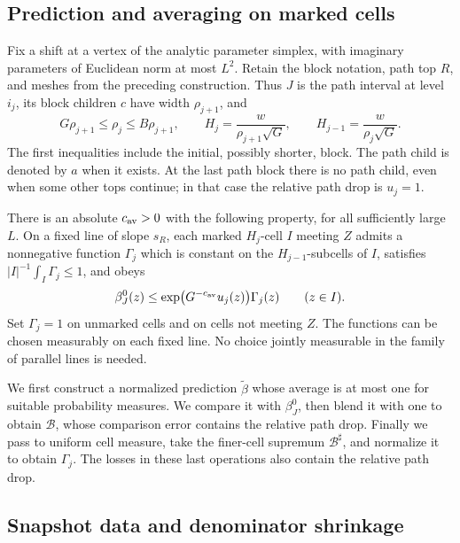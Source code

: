 \subsection{Prediction and averaging on marked cells}
\label{pred:section}

Fix a shift at a vertex of the analytic parameter simplex, with imaginary
parameters of Euclidean norm at most \(L^2\). Retain the block notation,
path top \(R\), and meshes from the preceding construction. Thus \(J\) is the
path interval at level \(i_j\), its block children \(c\) have width
\(\rho_{j+1}\), and
\[
 G\rho_{j+1}\le\rho_j\le B\rho_{j+1},\qquad
 H_j=\frac{w}{\rho_{j+1}\sqrt G},\qquad
 H_{j-1}=\frac{w}{\rho_j\sqrt G}.
\]
The first inequalities include the initial, possibly shorter, block.
The path child is denoted by \(a\) when it exists. At the last path
block there is no path child, even when some other tops continue; in that
case the relative path drop is \(u_j=1\).

\begin{proposition}
\label{pred:marked-comparison}
There is an absolute \(c_{\rm av}>0\) with the following property, for
all sufficiently large \(L\). On a fixed line of slope \(s_R\), each
marked \(H_j\)-cell \(I\) meeting \(Z\) admits a nonnegative function
\(\Gamma_j\) which is constant on the \(H_{j-1}\)-subcells of \(I\),
satisfies \( |I|^{-1}\int_I\Gamma_j\le1\), and obeys
\begin{equation}
 \beta_J^0(z)\le
       \exp\bigl(G^{-c_{\rm av}}u_j(z)\bigr)\Gamma_j(z)
       \qquad (z\in I).
 \label{eq:src-24}
\end{equation}
Set \(\Gamma_j=1\) on unmarked cells and on cells not meeting \(Z\).
The functions can be chosen measurably on each fixed line. No choice
jointly measurable in the family of parallel lines is needed.
\end{proposition}

We first construct a normalized prediction \(\widetilde\beta\) whose
average is at most one for suitable probability measures. We compare it
with \(\beta_J^0\), then blend it with one to obtain \(\mathcal B\), whose
comparison error contains the relative path drop. Finally we pass to
uniform cell measure, take the finer-cell supremum \(\mathcal B^\sharp\),
and normalize it to obtain \(\Gamma_j\). The losses in these last
operations also contain the relative path drop.

\subsection{Snapshot data and denominator shrinkage}

